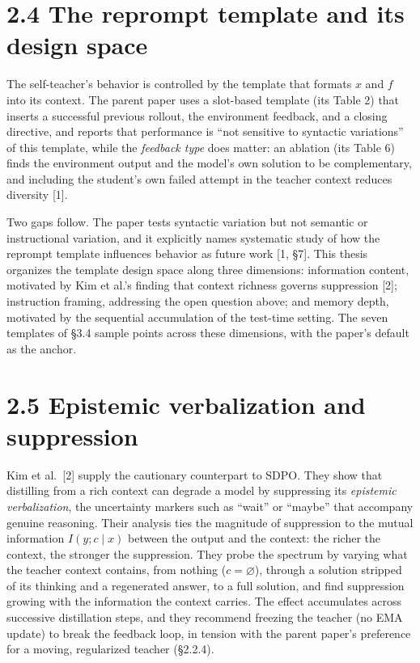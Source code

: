 \section{2.4 The reprompt template and its design space}\label{the-reprompt-template-and-its-design-space}

The self-teacher's behavior is controlled by the template that formats \(x\) and \(f\) into its context. The parent paper uses a slot-based template (its Table 2) that inserts a successful previous rollout, the environment feedback, and a closing directive, and reports that performance is ``not sensitive to syntactic variations'' of this template, while the \emph{feedback type} does matter: an ablation (its Table 6) finds the environment output and the model's own solution to be complementary, and including the student's own failed attempt in the teacher context reduces diversity {[}1{]}.

Two gaps follow. The paper tests syntactic variation but not semantic or instructional variation, and it explicitly names systematic study of how the reprompt template influences behavior as future work {[}1, §7{]}. This thesis organizes the template design space along three dimensions: information content, motivated by Kim et al.'s finding that context richness governs suppression {[}2{]}; instruction framing, addressing the open question above; and memory depth, motivated by the sequential accumulation of the test-time setting. The seven templates of §3.4 sample points across these dimensions, with the paper's default as the anchor.

\section{2.5 Epistemic verbalization and suppression}\label{epistemic-verbalization-and-suppression}

Kim et al.~{[}2{]} supply the cautionary counterpart to SDPO. They show that distilling from a rich context can degrade a model by suppressing its \emph{epistemic verbalization}, the uncertainty markers such as ``wait'' or ``maybe'' that accompany genuine reasoning. Their analysis ties the magnitude of suppression to the mutual information \(I(y; c \mid x)\) between the output and the context: the richer the context, the stronger the suppression. They probe the spectrum by varying what the teacher context contains, from nothing (\(c = \varnothing\)), through a solution stripped of its thinking and a regenerated answer, to a full solution, and find suppression growing with the information the context carries. The effect accumulates across successive distillation steps, and they recommend freezing the teacher (no EMA update) to break the feedback loop, in tension with the parent paper's preference for a moving, regularized teacher (§2.2.4).

